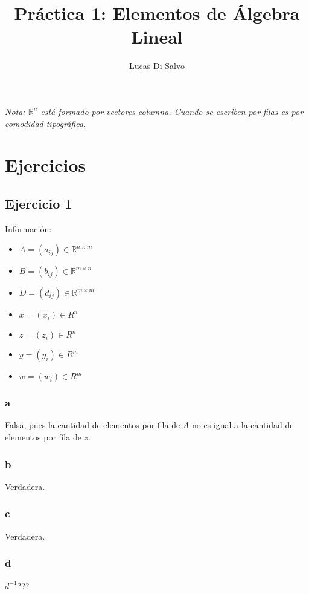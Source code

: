 \documentclass{article}
\title{Práctica 1: Elementos de Álgebra Lineal}
\author{Lucas Di Salvo}
\date{}
\begin{document}
\maketitle

\emph{Nota: $\mathbb{R}^{n}$ está formado por vectores columna. 
    Cuando se escriben por filas es por comodidad tipográfica.}

\section*{Ejercicios}

\subsection*{Ejercicio 1}

Información:

\begin{multicols}{3}
    \begin{itemize}
        \item[] $A = (a_{ij}) \in \mathbb{R}^{n\times m}$
        \item[] $B = (b_{ij}) \in \mathbb{R}^{m\times n}$
        \item[] $D = (d_{ij}) \in \mathbb{R}^{m\times m}$
        \item[] $x = (x_i) \in R^n$
        \item[] $z = (z_i) \in R^n$
        \item[] $y = (y_i) \in R^m$
        \item[] $w = (w_i) \in R^m$
    \end{itemize}
\end{multicols}


\subsubsection*{a}
Falsa, pues la cantidad de elementos por fila de $A$ no es igual a la cantidad de elementos por fila de $z$.
\subsubsection*{b}
Verdadera.
\subsubsection*{c}
Verdadera.
\subsubsection*{d}
$d^{-1}$???
\end{document}
